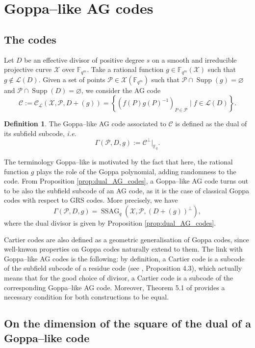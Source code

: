 \documentclass[a4paper]{article}
\theoremstyle{definition}
\newtheorem{definition}[thm]{Definition}
\theoremstyle{remark}
\newcommand{\calP}{\mathcal{P}}
\newcommand{\calL}{\mathcal{L}}
\newcommand{\calC}{\mathcal{C}}
\newcommand{\calX}{\mathcal{X}}
\newcommand{\fqm}{\mathbb{F}_{q^m}}
\newcommand{\fq}{\mathbb{F}_{q}}
\newcommand{\set}[1]{\left\{#1\right\}}
\newcommand{\Supp}{\operatorname{Supp}}
\newcommand{\ssag}[1]{\operatorname{SSAG}_{q}\left(#1\right)}
\begin{document}
\section{Goppa--like AG codes}

\subsection{The codes}

Let $D$ be an effective divisor of positive degree $s$ on a smooth and irreducible projective curve $\calX$ over $\fqm$. Take a rational function $g \in \fqm(\calX)$ such that $g \notin \calL(D)$. Given a set of points $\calP \in \calX(\fqm)$ such that $\calP \cap \Supp(g) = \varnothing$ and $\calP \cap \Supp(D) = \varnothing$, we consider the AG code
\[\calC := \calC_{\calL}(\calX,\calP,D+(g))=\set{\left(f(P)g(P)^{-1}\right)_{P \in \calP} \mid f \in \calL(D)}.\]

\begin{definition} \label{def:Goppa--like_AG_code}
The Goppa--like AG code associated to $\calC$ is defined as the dual of its subfield subcode, \emph{i.e.}
$$ \Gamma(\calP,D,g) := \calC^{\perp}|_{\fq}.$$
\end{definition}

The terminology Goppa--like is motivated by the fact that here, the rational function $g$ plays the role of the Goppa polynomial, adding randomness to the code. From Proposition \ref{prop:dual_AG_codes}, a Goppa--like AG code turns out to be also the subfield subcode of an AG code, as it is the case of classical Goppa codes with respect to GRS codes. More precisely, we have 
$$ \Gamma(\calP,D,g) = \ssag{\calX,\calP,(D+(g))^{\perp}},$$
where the dual divisor is given by Proposition \ref{prop:dual_AG_codes}. 

Cartier codes \cite{Cou14} are also defined as a geometric generalisation of Goppa codes, since well-knwon properties on Goppa codes naturally extend to them.
The link with Goppa--like AG codes is the following: by definition, a Cartier code is a subcode of the subfield subcode of a residue code (see \cite{Cou14}, Proposition 4.3), which actually means that for the good choice of divisor, a Cartier code is a subcode of the corresponding Goppa--like AG code. Moreover, Theorem 5.1 of \cite{Cou14} provides a necessary condition for both constructions to be equal.


\subsection{On the dimension of the square of the dual of a Goppa--like code}
\end{document}
